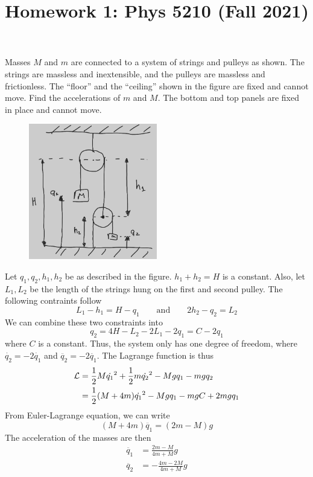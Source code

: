 \documentclass[12pt]{article}
\title{Homework 1: Phys 5210 (Fall 2021)}
\begin{document}
\maketitle

\begin{problem}{1}

Masses $M$ and $m$ are connected to a system of strings and pulleys as shown.
The strings are massless and inextensible, and the pulleys are massless and
frictionless. The ``floor'' and the ``ceiling'' shown in the figure are fixed
and cannot move. Find the accelerations of $m$ and $M$. The bottom and top
panels are fixed in place and cannot move.

\begin{figure}[h]
    \centering
    \includegraphics[width=0.5\textwidth]{hw1_p1.jpg}
\end{figure}

\begin{solution}

Let $q_1,q_2,h_1,h_2$ be as described in the figure. $h_1+h_2=H$ is a constant.
Also, let $L_1,L_2$ be the length of the strings hung on the first and second
pulley. The following contraints follow
\begin{equation}
    L_1-h_1=H-q_1  
    \qquad\text{and}\qquad 2h_2-q_2=L_2
\end{equation}
We can combine these two constraints into
\begin{equation}
    q_2=4H-L_2-2L_1-2q_1=C-2q_1 
\end{equation}
where $C$ is a constant. Thus, the system only has one degree of freedom, where
$\dot{q_2}=-2\dot{q_1}$ and $\ddot{q_2}=-2\ddot{q_1}$. The Lagrange function is
thus
\begin{align}
    \mathcal{L}&=\frac12M\dot{q_1}^2+\frac12m\dot{q_2}^2-Mgq_1-mgq_2\notag\\
       &=\frac12\qty(M+4m)\dot{q_1}^2-Mgq_1-mgC+2mgq_1
\end{align}
From Euler-Lagrange equation, we can write
\begin{equation}
    (M+4m)\ddot{q_1}=(2m-M)g
\end{equation}
The acceleration of the masses are then
\begin{subequations}
    \begin{align}
        \ddot{q_1}&=\frac{2m-M}{4m+M}g\\
        \ddot{q_2}&=-\frac{4m-2M}{4m+M}g
    \end{align} 
\end{subequations}



\end{solution}
\end{problem}
\end{document}
